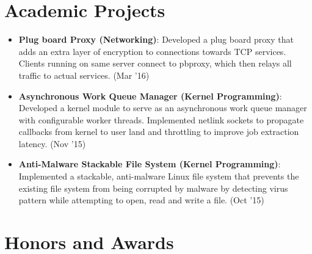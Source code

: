\documentclass[letterpaper,10.8pt]{article}
\newcommand{\resumeItem}[2]{
  \item\small{
    \textbf{#1}{: #2 \vspace{-2pt}}
  }
}
\newcommand{\resumeSubItem}[2]{\resumeItem{#1}{#2}\vspace{-4pt}}
\newcommand{\resumeSubHeadingListStart}{\begin{itemize}[leftmargin=*]}
\newcommand{\resumeSubHeadingListEnd}{\end{itemize}}
\begin{document}
\section{Academic Projects}
\resumeSubHeadingListStart
\resumeSubItem{Plug board Proxy (Networking)}{Developed a plug board proxy that adds an extra layer of encryption to connections towards TCP services. Clients running on same server connect to pbproxy, which then relays all traffic to actual services. (Mar '16)}
\resumeSubItem{Asynchronous Work Queue Manager (Kernel Programming)}{Developed a kernel module to serve as an asynchronous work queue manager with configurable worker threads. Implemented netlink sockets to propagate callbacks from kernel to user land and throttling to improve job extraction latency. (Nov '15)}
\resumeSubItem{Anti-Malware Stackable File System (Kernel Programming)}{Implemented a stackable, anti-malware Linux file system that prevents the existing file system from being corrupted by malware by detecting virus pattern while attempting to open, read and write a file. (Oct '15)}

\resumeSubHeadingListEnd

\section{Honors and Awards}

\end{document}
